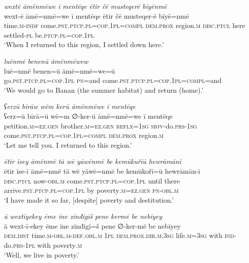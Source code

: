 \ea \label{ŽM.51}
\textit{wextē āmēnmēwe ī mentēqe ētir čē musteqerē bīyēnmē} \\ 
\gll wext-ē āmē=nmē=we ī mentēqe ētir čē musteqer-ē bīyē=nmē \\ 
 time\textsc{.m}\textsc{-indf} come\textsc{.pst}\textsc{.ptcp}\textsc{.pl}\textsc{=cop}\textsc{.\textsc{1pl}}\textsc{=compl} \textsc{dem.prox} region\textsc{.m} \textsc{disc}.\textsc{ptcl} here settled\textsc{\textsc{-pl}} be\textsc{.ptcp}\textsc{.pl}\textsc{=cop}\textsc{.\textsc{1pl}} \\ 
\glt `When I returned to this region, I settled down here.'
\z 
 
\ea \label{ŽM.52}
\textit{luēnmē benenū āmēnmēwew} \\ 
\gll luē=nmē benen=ū āmē=nmē=we=ū \\ 
 go\textsc{.pst}\textsc{.ptcp}\textsc{.pl}\textsc{=cop}\textsc{.\textsc{1pl}} \textsc{pn}=and come\textsc{.pst}\textsc{.ptcp}\textsc{.pl}\textsc{=cop}\textsc{.\textsc{1pl}}\textsc{=compl}=and \\ 
\glt `We would go to Banan (the summer habitat) and return (home).'
\z 
 
\ea \label{ŽM.53}
\textit{ʕerzū birāw wēm kerū āmēnmēwe ī mentēqe} \\ 
\gll ʕerz=ū birā=ū wē=m ∅-ker-ū āmē=nmē=we ī mentēqe \\ 
 petition\textsc{.m}\textsc{=ez.gen} brother\textsc{.m}\textsc{=ez.gen} \textsc{reflx}\textsc{=\textsc{1sg}} \textsc{sbjv-}do\textsc{.prs}\textsc{-\textsc{1sg}} come\textsc{.pst}\textsc{.ptcp}\textsc{.pl}\textsc{=cop}\textsc{.\textsc{1pl}}\textsc{=compl} \textsc{dem.prox} region\textsc{.m} \\ 
\glt `Let me tell you. I returned to this region.'
\z 
 
\ea \label{ŽM.54}
\textit{ētir īsey āmēnmē tā wē yāwēnmē be kemūkuřīū hewrāmānī} \\ 
\gll ētir īse-ī āmē=nmē tā wē yāwē=nmē be kemūkořī=ū hewrāmān-ī \\ 
 \textsc{disc}.\textsc{ptcl} now\textsc{-obl}\textsc{.m} come\textsc{.pst}\textsc{.ptcp}\textsc{.pl}\textsc{=cop}\textsc{.\textsc{1pl}} until there arrive\textsc{.pst}\textsc{.ptcp}\textsc{.pl}\textsc{=cop}\textsc{.\textsc{1pl}} by poverty\textsc{.m}\textsc{=ez.gen} \textsc{pn}\textsc{-obl}\textsc{.m} \\ 
\glt `I have made it so far, [despite] poverty and destitution.'
\z 
 
\ea \label{ŽM.57}
\textit{ā wextīyekey ēme īne zinđigīš pene kermē be nebīyey} \\ 
\gll ā wext-ī-ekey ēme īne zinđigī=š pene ∅-ker-mē be nebīyey \\ 
 \textsc{dem.dist} time\textsc{.m}\textsc{-obl}\textsc{.m}\textsc{-def}\textsc{.obl}\textsc{.m} \textsc{1pl} \textsc{dem.prox}\textsc{.dir}\textsc{.m}\textsc{.3sg} life\textsc{.m}\textsc{=3sg} with \textsc{ind-}do\textsc{.prs}\textsc{-\textsc{1pl}} with poverty\textsc{.m} \\ 
\glt `Well, we live in poverty.'
\z 
 
